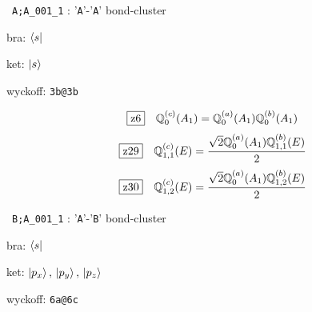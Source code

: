 \documentclass[fleqn,10pt,landscape]{jsarticle}
\begin{document}
\noindent\textbullet\, \texttt{A;A_001_1} : '\texttt{A}'-'\texttt{A}' bond-cluster

\noindent\quad * bra: $\bra{s}$

\noindent\quad * ket: $\ket{s}$

\noindent\quad * wyckoff: \texttt{3b@3b}

\begin{dmath*}
\hspace*{3mm}\fbox{z6}\quad \mathbb{Q}_{0}^{(c)}(A_{1})=\mathbb{Q}_{0}^{(a)}(A_{1}) \mathbb{Q}_{0}^{(b)}(A_{1})
\end{dmath*}
\begin{dmath*}
\hspace*{3mm}\fbox{z29}\quad \mathbb{Q}_{1,1}^{(c)}(E)=\frac{\sqrt{2} \mathbb{Q}_{0}^{(a)}(A_{1}) \mathbb{Q}_{1,1}^{(b)}(E)}{2}
\end{dmath*}
\begin{dmath*}
\hspace*{3mm}\fbox{z30}\quad \mathbb{Q}_{1,2}^{(c)}(E)=\frac{\sqrt{2} \mathbb{Q}_{0}^{(a)}(A_{1}) \mathbb{Q}_{1,2}^{(b)}(E)}{2}
\end{dmath*}
\vspace{5mm}

\noindent\textbullet\, \texttt{B;A_001_1} : '\texttt{A}'-'\texttt{B}' bond-cluster

\noindent\quad * bra: $\bra{s}$

\noindent\quad * ket: $\ket{p_{x}},\, \ket{p_{y}},\, \ket{p_{z}}$

\noindent\quad * wyckoff: \texttt{6a@6c}
\end{document}
